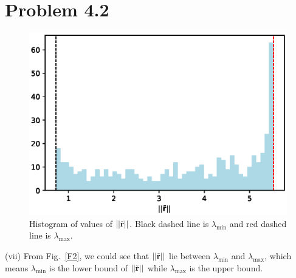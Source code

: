 \documentclass[twoside,11pt]{homework}
\begin{document}
{\section*{Problem 4.2}
%
\begin{figure}[ht]
\centering
\includegraphics[]{hist2.eps}
\caption{Histogram of values of $||\tilde{\bf{r}}||$. Black dashed line is $\lambda_\mathrm{min}$ and red dashed line is $\lambda_\mathrm{max}$.}
\label{F2}
\end{figure}
%
\noindent (vii) From Fig.~\eqref{F2}, we could see that $||\tilde{\bf{r}}||$ lie between $\lambda_\mathrm{min}$ and $\lambda_\mathrm{max}$, which means $\lambda_\mathrm{min}$ is the lower bound of $||\tilde{\bf{r}}||$ while $\lambda_\mathrm{max}$ is the upper bound. 

}
\end{document}
